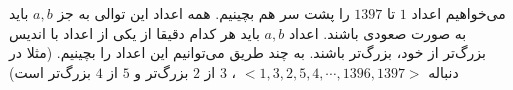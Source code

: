     \p 
می‌خواهیم اعداد
$1$
تا
$1397$
را پشت سر هم بچینیم. همه اعداد این توالی به جز
$a, b$
باید به صورت صعودی باشند. اعداد
$a, b$
باید هر کدام دقیقا از یکی از اعداد با اندیس بزرگ‌تر از خود، بزرگ‌تر باشند. به چند طریق می‌توانیم این اعداد را بچینیم. (مثلا در دنباله
$<1, 3, 2, 5, 4, \cdots, 1396, 1397>$
،
$3$
از
$2$
بزرگ‌تر و
$5$
از
$4$
بزرگ‌تر است)